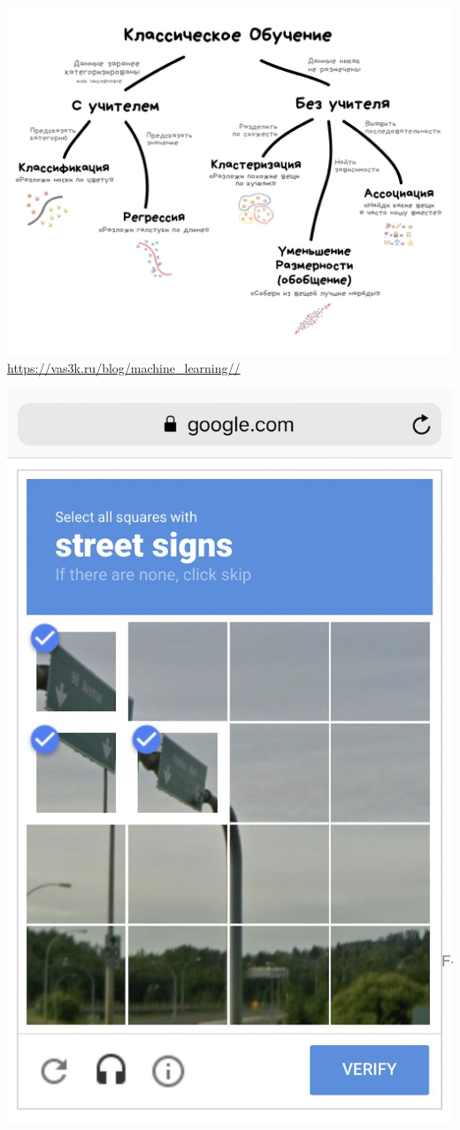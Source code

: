 \documentclass[aspectratio=169,newPxFont]{beamer}
\begin{document}
\begin{frame}{}
\centering \includegraphics[width=0.7\linewidth]{map2.jpg}\\
{\url{https://vas3k.ru/blog/machine_learning//}}
\end{frame}

\begin{frame}{}
\centering \includegraphics[width=0.35\linewidth]{captcha.jpg}\\
\end{frame}
\end{document}
